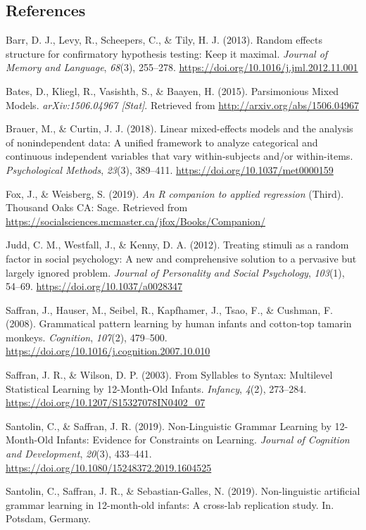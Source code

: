 \begin{appendix}
\hypertarget{references}{%
\subsection{References}\label{references}}

\begingroup
\setlength{\parindent}{-0.5in}
\setlength{\leftskip}{0.5in}

\hypertarget{refs}{}
\leavevmode\hypertarget{ref-barr2013}{}%
Barr, D. J., Levy, R., Scheepers, C., \& Tily, H. J. (2013). Random
effects structure for confirmatory hypothesis testing: Keep it maximal.
\emph{Journal of Memory and Language}, \emph{68}(3), 255--278.
\url{https://doi.org/10.1016/j.jml.2012.11.001}

\leavevmode\hypertarget{ref-bates2015a}{}%
Bates, D., Kliegl, R., Vasishth, S., \& Baayen, H. (2015). Parsimonious
Mixed Models. \emph{arXiv:1506.04967 {[}Stat{]}}. Retrieved from
\url{http://arxiv.org/abs/1506.04967}

\leavevmode\hypertarget{ref-brauer2018}{}%
Brauer, M., \& Curtin, J. J. (2018). Linear mixed-effects models and the
analysis of nonindependent data: A unified framework to analyze
categorical and continuous independent variables that vary
within-subjects and/or within-items. \emph{Psychological Methods},
\emph{23}(3), 389--411. \url{https://doi.org/10.1037/met0000159}

\leavevmode\hypertarget{ref-fox2019}{}%
Fox, J., \& Weisberg, S. (2019). \emph{An R companion to applied
regression} (Third). Thousand Oaks CA: Sage. Retrieved from
\url{https://socialsciences.mcmaster.ca/jfox/Books/Companion/}

\leavevmode\hypertarget{ref-judd2012}{}%
Judd, C. M., Westfall, J., \& Kenny, D. A. (2012). Treating stimuli as a
random factor in social psychology: A new and comprehensive solution to
a pervasive but largely ignored problem. \emph{Journal of Personality
and Social Psychology}, \emph{103}(1), 54--69.
\url{https://doi.org/10.1037/a0028347}

\leavevmode\hypertarget{ref-saffran2008}{}%
Saffran, J., Hauser, M., Seibel, R., Kapfhamer, J., Tsao, F., \&
Cushman, F. (2008). Grammatical pattern learning by human infants and
cotton-top tamarin monkeys. \emph{Cognition}, \emph{107}(2), 479--500.
\url{https://doi.org/10.1016/j.cognition.2007.10.010}

\leavevmode\hypertarget{ref-saffran2003}{}%
Saffran, J. R., \& Wilson, D. P. (2003). From Syllables to Syntax:
Multilevel Statistical Learning by 12-Month-Old Infants. \emph{Infancy},
\emph{4}(2), 273--284. \url{https://doi.org/10.1207/S15327078IN0402_07}

\leavevmode\hypertarget{ref-santolin2019}{}%
Santolin, C., \& Saffran, J. R. (2019). Non-Linguistic Grammar Learning
by 12-Month-Old Infants: Evidence for Constraints on Learning.
\emph{Journal of Cognition and Development}, \emph{20}(3), 433--441.
\url{https://doi.org/10.1080/15248372.2019.1604525}

\leavevmode\hypertarget{ref-santolin2019a}{}%
Santolin, C., Saffran, J. R., \& Sebastian-Galles, N. (2019).
Non-linguistic artificial grammar learning in 12-month-old infants: A
cross-lab replication study. In. Potsdam, Germany.

\endgroup
\end{appendix}
